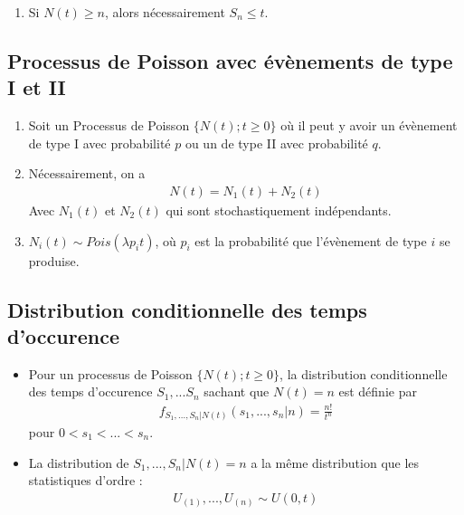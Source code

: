 \documentclass[10pt, french, landscape]{article}
\begin{document}
\begin{multicols*}{3}
\begin{enumerate}[label=\faAngleRight]
\item Si $N(t) \geq n$, alors nécessairement $S_n \leq t$.
\end{enumerate}

\subsection*{Processus de Poisson avec évènements de type I et II}
\begin{enumerate}[label=\faAngleRight]
\item Soit un Processus de Poisson $\{N(t) ; t \geq 0 \}$ où il peut y avoir un évènement de type I avec probabilité $p$ ou un de type II avec probabilité $q$.
\item Nécessairement, on a
\begin{align*}
N(t) = N_1(t) + N_2(t)
\end{align*}
Avec $N_1(t)$ et $N_2(t)$ qui sont stochastiquement indépendants.

\item $N_i(t) \sim Pois(\lambda p_i t)$, où $p_i$ est la probabilité que l'évènement de type $i$ se produise.
\end{enumerate}


\subsection*{Distribution conditionnelle des temps d'occurence}
\begin{itemize}
\item Pour un processus de Poisson $\{ N(t) ; t \geq 0 \}$, la distribution conditionnelle des temps d'occurence $S_1, ... S_n$ sachant que $N(t) = n$ est définie par
\begin{align*}
f_{S_1, ..., S_n | N(t)}(s_1, ..., s_n | n) = \frac{n!}{t^n}
\end{align*}
pour $0 < s_1 < ... < s_n$.

\item La distribution de $S_1, ..., S_n | N(t) = n$ a la même distribution que les statistiques d'ordre : 
\begin{align*}
U_{(1)}, ..., U_{(n)} \sim U(0,t)
\end{align*}
\end{itemize}


\end{multicols*}
\end{document}

